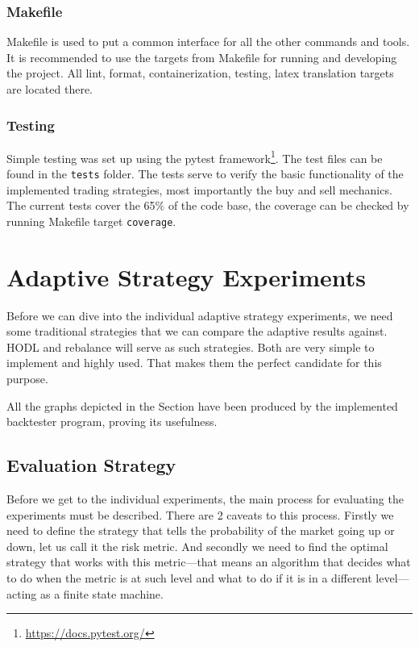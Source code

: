 \subsection*{Makefile}
Makefile is used to put a common interface for all the other commands and tools. It is recommended to use the targets from Makefile for running and developing the project. All lint, format, containerization, testing, latex translation targets are located there.

\subsection*{Testing}
Simple testing was set up using the pytest framework\footnote{\url{https://docs.pytest.org/}}. The test files can be found in the \texttt{tests} folder. The tests serve to verify the basic functionality of the implemented trading strategies, most importantly the buy and sell mechanics. The current tests cover the 65\% of the code base, the coverage can be checked by running Makefile target \texttt{coverage}.

\chapter{Adaptive Strategy Experiments}
\label{chapter-experiments}

Before we can dive into the individual adaptive strategy experiments, we need some traditional strategies that we can compare the adaptive results against. HODL and rebalance will serve as such strategies. Both are very simple to implement and highly used. That makes them the perfect candidate for this purpose.

All the graphs depicted in the Section have been produced by the implemented backtester program, proving its usefulness.

\section{Evaluation Strategy}
Before we get to the individual experiments, the main process for evaluating the experiments must be described. There are 2 caveats to this process. Firstly we need to define the strategy that tells the probability of the market going up or down, let us call it the risk metric. And secondly we need to find the optimal strategy that works with this metric---that means an algorithm that decides what to do when the metric is at such level and what to do if it is in a different level---acting as a finite state machine.

